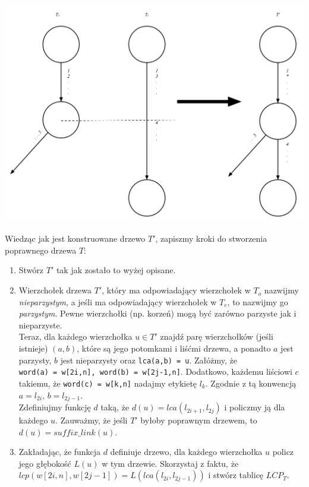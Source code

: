 \documentclass[a4paper,oneside,10pt]{book}
\begin{document}
\begin{center}
 \includegraphics[scale=0.1,keepaspectratio=true]{../graphics/overmergingSuffixTrees.jpg}
\end{center}


Wiedząc jak jest konstruowane drzewo $T'$, zapiszmy kroki do stworzenia poprawnego drzewa $T$:
\begin{enumerate}
 \item Stwórz $T'$ tak jak zostało to wyżej opisane.
 \item Wierzchołek drzewa $T'$, który ma odpowiadający wierzchołek w $T_o$ nazwijmy \textit{nieparzystym}, a jeśli ma odpowiadający wierzchołek w $T_e$, to nazwijmy go \textit{parzystym}. Pewne wierzchołki (np. korzeń) mogą być zarówno parzyste jak i nieparzyste.\\
 Teraz, dla każdego wierzchołka $u \in T'$ znajdź parę wierzchołków (jeśli istnieje) $(a,b)$, które są jego potomkami i liśćmi drzewa, a ponadto $a$ jest parzysty, $b$ jest nieparzysty oraz \verb|lca(a,b) = u|. Załóżmy, że \\ \verb|word(a) = w[2i,n], word(b) = w[2j-1,n]|. Dodatkowo, każdemu liściowi $c$ takiemu, że \verb|word(c) = w[k,n]| nadajmy etykietę $l_k$. Zgodnie z tą konwencją $a = l_{2i}, \, b = l_{2j - 1}$.
 \\
 Zdefiniujmy funkcję $d$ taką, że $d(u) = lca(l_{2i+1}, l_{2j})$ i policzmy ją dla każdego $u$. Zauważmy, że jeśli $T'$ byłoby poprawnym drzewem, to $d(u) = suffix
\_link(u)$.
 \item Zakładając, że funkcja $d$ definiuje drzewo, dla każdego wierzchołka $u$ policz jego głębokość $L(u)$ w tym drzewie. Skorzystaj z faktu, że $lcp(w[2i,n], w[2j-1]) = L(lca(l_{2i}, l_{2j-1}))$ i stwórz tablicę $LCP_T$. 
\end{enumerate}
\end{document}
